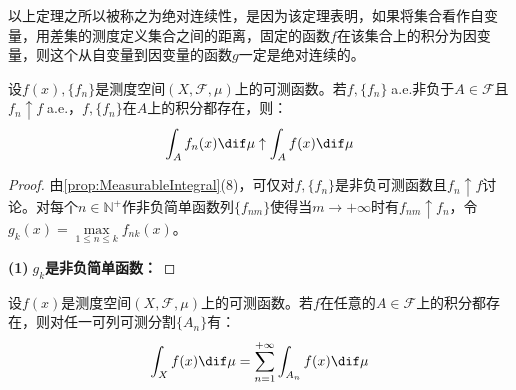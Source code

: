 \begin{note}
	以上定理之所以被称之为绝对连续性，是因为该定理表明，如果将集合看作自变量，用差集的测度定义集合之间的距离，固定的函数$f$在该集合上的积分为因变量，则这个从自变量到因变量的函数$g$一定是绝对连续的。
\end{note}
\begin{theorem}\label{theo:LeviTheorem}
	设$f(x),\{f_n\}$是测度空间$(X,\mathscr{F},\mu)$上的可测函数。若$f,\{f_n\}\;$a.e.非负于$A\in\mathscr{F}$且$f_n\uparrow f\;$a.e.，$f,\{f_n\}$在$A$上的积分都存在，则：
	\begin{equation*}
		\int_{A}f_n(x)\dif\mu\uparrow\int_{A}f(x)\dif\mu
	\end{equation*}
\end{theorem}
\begin{proof}
	由\cref{prop:MeasurableIntegral}(8)，可仅对$f,\{f_n\}$是非负可测函数且$f_n\uparrow f$讨论。对每个$n\in\mathbb{N}^+$作非负简单函数列$\{f_{nm}\}$使得当$m\to+\infty$时有$f_{nm}\uparrow f_n$，令$g_k(x)=\max\limits_{1\leqslant n\leqslant k}f_{nk}(x)$。\par
	\textbf{(1)$\;g_k$是非负简单函数：}
\end{proof}
\begin{theorem}
	设$f(x)$是测度空间$(X,\mathscr{F},\mu)$上的可测函数。若$f$在任意的$A\in\mathscr{F}$上的积分都存在，则对任一可列可测分割$\{A_n\}$有：
	\begin{equation*}
		\int_{X}f(x)\dif\mu=\sum_{n=1}^{+\infty}\int_{A_n}f(x)\dif\mu
	\end{equation*}
\end{theorem}
